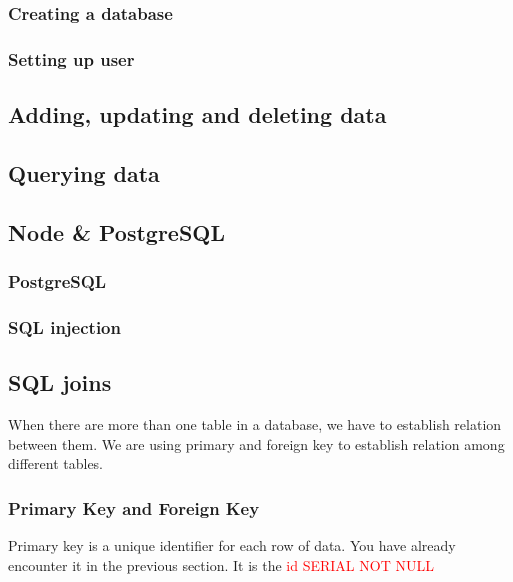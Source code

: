 \documentclass[a4paper]{article}
\begin{document}
\subsubsection{Creating a database}

\subsubsection{Setting up user}

\begin{eg}

\end{eg}

\subsection{Adding, updating and deleting data}

\subsection{Querying data}

\begin{eg}

\end{eg}

\subsection{Node \& PostgreSQL}
\subsubsection{PostgreSQL}
\begin{eg}

\end{eg}
\subsubsection{SQL injection}
\subsection{SQL joins}
When there are more than one table in a database, we have to establish relation between them. We are using primary and foreign key to establish relation among different tables.
\subsubsection{Primary Key and Foreign Key}
Primary key is a unique identifier for each row of data. You have already encounter it in the previous section. It is the \textcolor{red}{id SERIAL NOT NULL}
\end{document}
